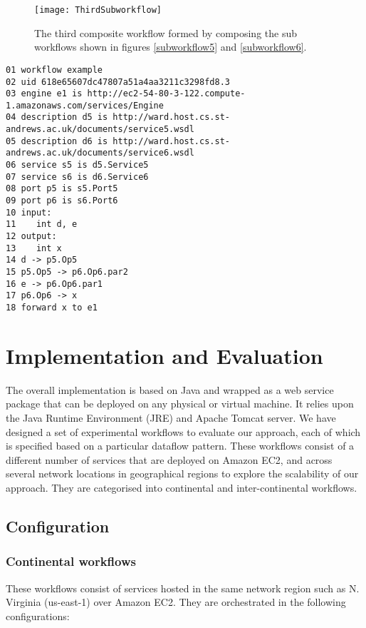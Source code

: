 \documentclass[10pt, conference, compsocconf]{IEEEtran}
\begin{document}
\begin{figure}[h]
\centerline{\texttt{[image: ThirdSubworkflow]}}
\caption{The third composite workflow formed by composing the sub workflows shown in figures \ref{subworkflow5} and \ref{subworkflow6}.}
\label{third}
\end{figure}

\begin{lstlisting}[keywords={workflow, forward, uid, engine, future, description, service, port, engine, is, input, output, int, any, transmit, to}, caption={Specification of the third composite workflow shown in figure \ref{third}.}, label={listing4}, frame=single]
01 workflow example
02 uid 618e65607dc47807a51a4aa3211c3298fd8.3
03 engine e1 is http://ec2-54-80-3-122.compute-1.amazonaws.com/services/Engine
04 description d5 is http://ward.host.cs.st-andrews.ac.uk/documents/service5.wsdl
05 description d6 is http://ward.host.cs.st-andrews.ac.uk/documents/service6.wsdl
06 service s5 is d5.Service5
07 service s6 is d6.Service6
08 port p5 is s5.Port5
09 port p6 is s6.Port6
10 input: 
11    int d, e
12 output:
13    int x
14 d -> p5.Op5
15 p5.Op5 -> p6.Op6.par2
16 e -> p6.Op6.par1
17 p6.Op6 -> x
18 forward x to e1
\end{lstlisting}

\section{Implementation and Evaluation}\label{Evaluation}
The overall implementation is based on Java and wrapped as a web service package that can be deployed on any physical or virtual machine.
It relies upon the Java Runtime Environment (JRE) and Apache Tomcat server.
We have designed a set of experimental workflows to evaluate our approach, each of which is specified based on a particular dataflow pattern.
These workflows consist of a different number of services that are deployed on Amazon EC2, and across several network locations in geographical regions to explore the scalability of our approach.
They are categorised into continental and inter-continental workflows.

\subsection{Configuration}

\subsubsection{Continental workflows}
These workflows consist of services hosted in the same network region such as N. Virginia (us-east-1) over Amazon EC2.
They are orchestrated in the following configurations:
\end{document}
